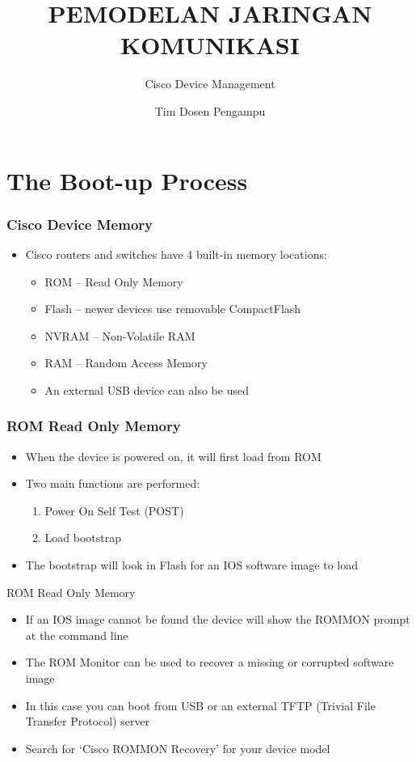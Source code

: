 \documentclass[pdflatex,compress,mathserif]{beamer}
\title{PEMODELAN JARINGAN KOMUNIKASI}
\subtitle{Cisco Device Management}
\author{Tim Dosen Pengampu}
\begin{document}
\maketitle

\section{The Boot-up Process}

\begin{frame}
	\frametitle{Cisco Device Memory}
	\begin{itemize}
		\item Cisco routers and switches have 4 built-in memory locations:
		\begin{itemize}
			\item ROM – Read Only Memory
			\item Flash – newer devices use removable CompactFlash
			\item NVRAM – Non-Volatile RAM
			\item RAM – Random Access Memory
			\item An external USB device can also be used
		\end{itemize}
	\end{itemize}
\end{frame}

\begin{frame}
	\frametitle{ROM Read Only Memory}
	\begin{itemize}
		\item When the device is powered on, it will first load from ROM
		\item Two main functions are performed:
		\begin{enumerate}
			\item Power On Self Test (POST)
			\item Load bootstrap
		\end{enumerate}
		\item The bootstrap will look in Flash for an IOS software image to load
	\end{itemize}
\end{frame}

\begin{frame}{ROM Read Only Memory}
	\begin{itemize}
		\item If an IOS image cannot be found the device will show the ROMMON prompt at the command line
		\item The ROM Monitor can be used to recover a missing or corrupted software image
		\item In this case you can boot from USB or an external TFTP (Trivial File Transfer Protocol) server
		\item Search for ‘Cisco ROMMON Recovery’ for your device model
	\end{itemize}
\end{frame}
\end{document}
